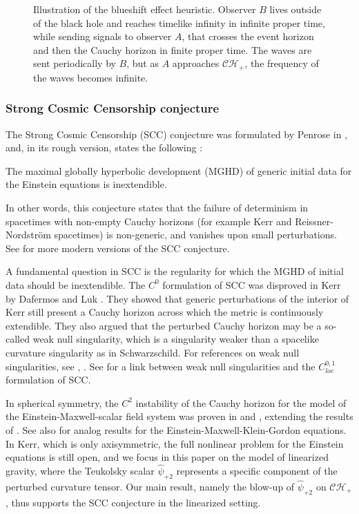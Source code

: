 \documentclass[reqno]{amsart}
\numberwithin{equation}{section}
\newcommand{\ch}{\mathcal{CH_+}}
\newcommand{\Psihat}{\widehat{\psi}}
\newcommand{\psihat}{\widehat{\psi}}
\newcommand{\Psihatp}{\Psihat_{+2}}
\newcommand{\psihatp}{\psihat_{+2}}
\theoremstyle{plain}
\theoremstyle{definition}
\theoremstyle{remark}
\numberwithin{equation}{section}
\begin{document}
\begin{figure}[h!]
    \caption{Illustration of the blueshift effect heuristic. Observer $B$ lives outside of the black hole and reaches timelike infinity in infinite proper time, while sending signals to observer $A$, that crosses the event horizon and then the Cauchy horizon in finite proper time. The waves are sent periodically by $B$, but as $A$ approaches $\ch$, the frequency of the waves becomes infinite.}
    \label{fig:blueshift}
\end{figure}
\subsubsection{Strong Cosmic Censorship conjecture}\label{subsection:SCC}
The Strong Cosmic Censorship (SCC) conjecture was formulated by Penrose in \cite{sccpenrose}, and, in its rough version, states the following :
\begin{conj}
    The maximal globally hyperbolic development (MGHD) of generic initial data for the Einstein equations is inextendible.
\end{conj}
In other words, this conjecture states {that the failure of determinism in} spacetimes with non-empty Cauchy horizons (for example Kerr and Reissner-Nordström spacetimes) is non-generic, and vanishes upon small perturbations.  See \cite{christo, chruscc} for more modern versions of the SCC conjecture. 

A fundamental question in SCC is the regularity for which the MGHD of initial data should be inextendible. The $C^0$ formulation of SCC was disproved in Kerr by Dafermos and Luk \cite{stabC0}. They showed that generic perturbations of the interior of Kerr still present a Cauchy horizon across which the metric is continuously extendible. They also argued that the perturbed Cauchy horizon may be a so-called weak null singularity, which is a singularity weaker than a spacelike curvature singularity as in Schwarzschild. For references on weak null singularities, see \cite{weakluk}, \cite{weakvdm}. See \cite{sbierskiholo} for a link between weak null singularities and the $C^{0,1}_{loc}$ formulation of SCC. 

In spherical symmetry, the $C^2$ instability of the Cauchy horizon for the model of the Einstein-Maxwell-scalar field system was proven in \cite{RNNLI} and \cite{RNNLII}, extending the results of \cite{dafscc}. See also \cite{vdmmmm,vdminsta} for analog results for the Einstein-Maxwell-Klein-Gordon equations. In Kerr, which is only axisymmetric, the full nonlinear problem for the Einstein equations is still open, and we focus in this paper on the model of linearized gravity, where the Teukolsky scalar $\psihatp$ represents a specific component of the perturbed curvature tensor. Our main result, namely the blow-up of $\Psihatp$ on $\ch$, thus supports the SCC conjecture in the linearized setting.
\end{document}
